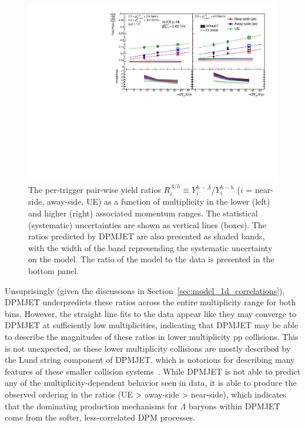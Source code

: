 \begin{figure}[h!]
\centering
\includegraphics[width=\textwidth]{figures/results/final_lambda_hadron_ratio_plot_new_x_axis_model_ratio.pdf}
\caption{The per-trigger pair-wise yield ratios $R_{i}^{\Lambda/h} \equiv Y_{i}^{h-\Lambda}$/$Y_{i}^{h-h}$ ($i$ = near-side, away-side, UE) as a function of multiplicity in the lower (left) and higher (right) associated momentum ranges. The statistical (systematic) uncertainties are shown as vertical lines (boxes). The ratios predicted by DPMJET are also presented as shaded bands, with the width of the band represending the systematic uncertainty on the model. The ratio of the model to the data is presented in the bottom panel.}
\label{fig:lambda_hadron_ratio_model}
\end{figure}

Unsuprisingly (given the discussions in Section~\ref{sec:model_1d_correlations}), DPMJET underpredicts these ratios across the entire multiplicity range for both \pt bins. However, the straight line fits to the data appear like they may converge to DPMJET at sufficiently low multiplicities, indicating that DPMJET may be able to describe the magnitudes of these ratios in lower multiplicity pp collisions. This is not unexpected, as these lower multiplicity collisions are mostly described by the Lund string component of DPMJET, which is notorious for describing many features of these smaller collision systems~\cite{Pythia}.  While DPMJET is not able to predict any of the multiplicity-dependent behavior seen in data, it is able to produce the observed ordering in the ratios (UE > away-side > near-side), which indicates that the dominating production mechanisms for $\Lambda$ baryons within DPMJET come from the softer, less-correlated DPM processes.

